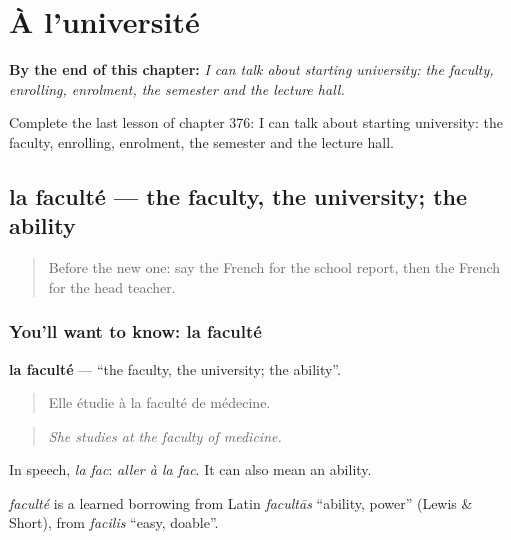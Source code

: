 
\chapter{À l'université}
\label{ch:fr-a-l-universite}

\begin{chapteropening}
\textbf{By the end of this chapter:} \emph{I can talk about starting university: the faculty, enrolling, enrolment, the semester and the lecture hall.}

Complete the last lesson of chapter 376: I can talk about starting university: the faculty, enrolling, enrolment, the semester and the lecture hall.
\end{chapteropening}

\section[la faculté]{la faculté — the faculty, the university; the ability}

\label{lesson:FR-C376-faculte}



\begin{quote}
Before the new one: say the French for the school report, then the French for the head teacher.
\end{quote}

\subsection*{You'll want to know: la faculté}
\textbf{la faculté} — \textquotedblleft{}the faculty, the university; the ability\textquotedblright{}.

\begin{quote}
Elle étudie à la faculté de médecine.
\end{quote}

\begin{quote}
\emph{She studies at the faculty of medicine.}
\end{quote}

In speech, \emph{la fac}: \emph{aller à la fac}. It can also mean an ability.

\begin{cousinweb}
\emph{faculté} is a learned borrowing from Latin \emph{facultās} \textquotedblleft{}ability, power\textquotedblright{} (Lewis \& Short), from \emph{facilis} \textquotedblleft{}easy, doable\textquotedblright{}.
\end{cousinweb}


